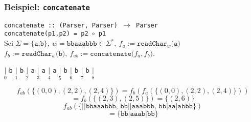 \documentclass{beamer}
\begin{document}


    \begin{frame}[t]
        \frametitle{\textbf{Beispiel:} \texttt{concatenate}}
        \texttt{concatenate ::\ (Parser, Parser) $\to$ Parser}\\
        \texttt{concatenate(p1,p2) = p2 $\circ$ p1}\\[10pt]
        Sei $\Sigma = \{\texttt{a,b}\},\ w = \texttt{bbaaabbb} \in \Sigma^*,\ f_a := \texttt{readChar$_w$(a)}$\\
        $f_b := \texttt{readChar$_w$(b)},\ f_{ab} := \texttt{concatenate($f_a,f_b$)}$.\\
        \begin{center}
            $\underset{0}{|}$
                {\Large\texttt{b}}
            $\underset{1}{|}$
                {\Large\texttt{b}}
            $\underset{2}{|}$
                {\Large\texttt{a}}
            $\underset{3}{|}$
                {\Large\texttt{a}}
            $\underset{4}{|}$
                {\Large\texttt{a}}
            $\underset{5}{|}$
                {\Large\texttt{b}}
            $\underset{6}{|}$
                {\Large\texttt{b}}
            $\underset{7}{|}$
                {\Large\texttt{b}}
            $\underset{8}{|}$
        \end{center}
        \pause
        $$
            f_{ab}(\{(0,0), (2,2), (2,4)\})
            = f_b(f_a(\{(0,0), (2,2), (2,4)\}))
        $$$$
            = f_b(\{(2,3), (2,5)\})
            = \{(2,6)\}
        $$
        \pause
        $$
            f_{ab}(\{\texttt{||bbaaabbb, bb||aaabbb, bb|aa|abbb}\})
        $$$$
            = \{\texttt{bb|aaab|bb}\}
        $$
    \end{frame}


\end{document}

